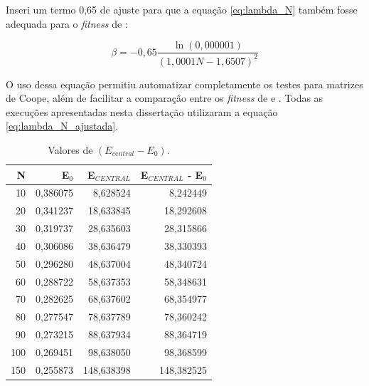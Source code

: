 	
	Inseri um termo 0,65 de ajuste para que a equação \ref{eq:lambda_N} também fosse adequada para o \emph{fitness} de \cite{metodo2004}:
	
	\begin{equation}\label{eq:lambda_N_ajustada}
		\beta = - 0,65 \frac{\ln(0,000001)}{(1,0001N - 1,6507)^2}
	\end{equation}
	
	O uso dessa equação permitiu automatizar completamente os testes para matrizes de Coope, além de facilitar a comparação entre os \emph{fitness} de \cite{metodo2004} e \cite{metodo2011}. Todas as execuções apresentadas nesta dissertação utilizaram a equação \ref{eq:lambda_N_ajustada}.
	
\begin{table}[htbp]
	\centering
	\caption{Valores de $(E_{central} - E_0)$.}
	\label{tab:ValoresDeECentralE02}
\begin{tabular}{rrrr}
\hline
         \textbf{N} & \textbf{E$_{0}$} &   \textbf{E$_{CENTRAL}$} & \textbf{E$_{CENTRAL}$} - \textbf{E$_{0}$} \\
\hline
        10 &   0,386075 &   8,628524 &   8,242449 \\

        20 &   0,341237 &  18,633845 &  18,292608 \\

        30 &   0,319737 &  28,635603 &  28,315866 \\

        40 &   0,306086 &  38,636479 &  38,330393 \\

        50 &   0,296280 &  48,637004 &  48,340724 \\

        60 &   0,288722 &  58,637353 &  58,348631 \\

        70 &   0,282625 &  68,637602 &  68,354977 \\

        80 &   0,277547 &  78,637789 &  78,360242 \\

        90 &   0,273215 &  88,637934 &  88,364719 \\

       100 &   0,269451 &  98,638050 &  98,368599 \\

       150 &   0,255873 & 148,638398 & 148,382525 \\


\end{tabular}
\end{table}
